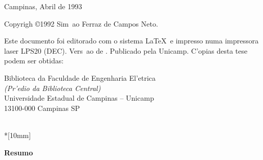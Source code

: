 \vfill

\begin{center}
			Campinas, Abril de 1993
\end{center}

\newpage
\thispagestyle{empty}


\begin{center}
\end{center}


Copyrigh \copyright 1992 Sim~ao Ferraz de Campos Neto. 

Este documento foi editorado com o sistema \LaTeX\ e impresso numa impressora laser LPS20 (DEC). Vers~ao de \hoje. Publicado pela Unicamp. C'opias desta tese podem ser obtidas:

{\centering \begin{minipage}{100mm}
                   Biblioteca da Faculdade de Engenharia El'etrica\\
                   {\em (Pr'edio da Biblioteca Central)}\\
                   Universidade Estadual de Campinas -- Unicamp\\
                   13100-000 Campinas SP
            \end{minipage}\\*[10mm]
}
 
\newpage
\thispagestyle{empty}

\begin{center}
		\bf Resumo
\end{center}


